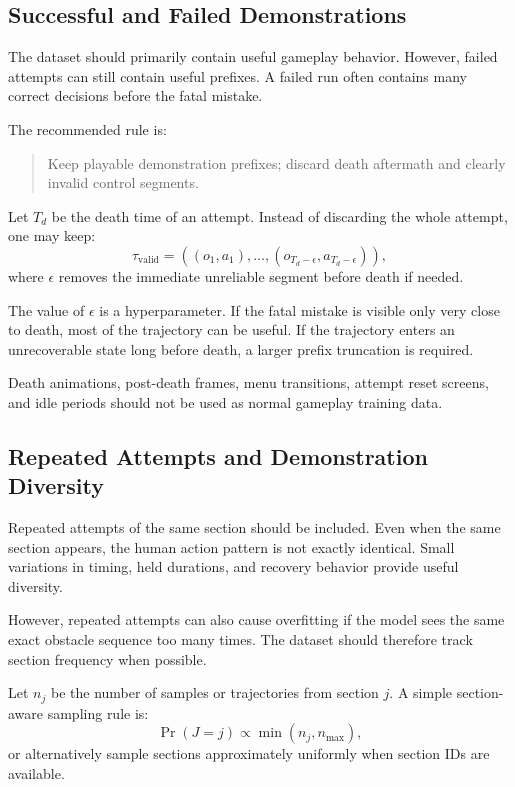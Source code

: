 \documentclass[11pt]{article}
\begin{document}
\subsection{Successful and Failed Demonstrations}

The dataset should primarily contain useful gameplay behavior. However, failed attempts can still contain useful prefixes. A failed run often contains many correct decisions before the fatal mistake.

The recommended rule is:
\begin{quote}
Keep playable demonstration prefixes; discard death aftermath and clearly invalid control segments.
\end{quote}

Let \(T_d\) be the death time of an attempt. Instead of discarding the whole attempt, one may keep:
\[
  \tau_{\mathrm{valid}} = ((o_1,a_1),\ldots,(o_{T_d-\epsilon},a_{T_d-\epsilon})),
\]
where \(\epsilon\) removes the immediate unreliable segment before death if needed.

The value of \(\epsilon\) is a hyperparameter. If the fatal mistake is visible only very close to death, most of the trajectory can be useful. If the trajectory enters an unrecoverable state long before death, a larger prefix truncation is required.

Death animations, post-death frames, menu transitions, attempt reset screens, and idle periods should not be used as normal gameplay training data.

\subsection{Repeated Attempts and Demonstration Diversity}

Repeated attempts of the same section should be included. Even when the same section appears, the human action pattern is not exactly identical. Small variations in timing, held durations, and recovery behavior provide useful diversity.

However, repeated attempts can also cause overfitting if the model sees the same exact obstacle sequence too many times. The dataset should therefore track section frequency when possible.

Let \(n_j\) be the number of samples or trajectories from section \(j\). A simple section-aware sampling rule is:
\[
  \Pr(J=j) \propto \min(n_j,n_{\max}),
\]
or alternatively sample sections approximately uniformly when section IDs are available.
\end{document}
